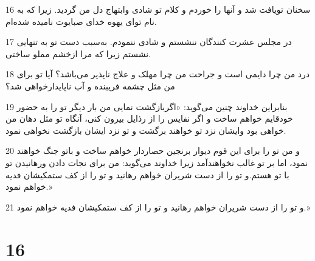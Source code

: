 \par 16 سخنان تویافت شد و آنها را خوردم و کلام تو شادی وابتهاج دل من گردید. زیرا که به نام تو‌ای یهوه خدای صبایوت نامیده شده‌ام.
\par 17 در مجلس عشرت کنندگان ننشستم و شادی ننمودم. به‌سبب دست تو به تنهایی نشستم زیرا که مرا ازخشم مملو ساختی.
\par 18 درد من چرا دایمی است و جراحت من چرا مهلک و علاج ناپذیر می‌باشد؟ آیا تو برای من مثل چشمه فریبنده و آب ناپایدارخواهی شد؟
\par 19 بنابراین خداوند چنین می‌گوید: «اگربازگشت نمایی من بار دیگر تو را به حضور خودقایم خواهم ساخت و اگر نفایس را از رذایل بیرون کنی، آنگاه تو مثل دهان من خواهی بود وایشان نزد تو خواهند برگشت و تو نزد ایشان بازگشت نخواهی نمود.
\par 20 و من تو را برای این قوم دیوار برنجین حصاردار خواهم ساخت و باتو جنگ خواهند نمود، اما بر تو غالب نخواهندآمد زیرا خداوند می‌گوید: من برای نجات دادن ورهانیدن تو با تو هستم.و تو را از دست شریران خواهم رهانید و تو را از کف ستمکیشان فدیه خواهم نمود.»
\par 21 و تو را از دست شریران خواهم رهانید و تو را از کف ستمکیشان فدیه خواهم نمود.»
 
\chapter{16}

